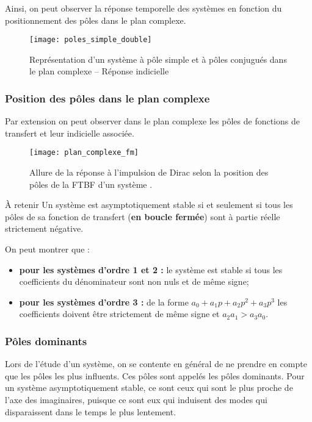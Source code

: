 Ainsi, on peut observer la réponse temporelle des systèmes en fonction du positionnement des pôles dans le plan complexe. 

\begin{figure}[H]
\centering
\texttt{[image: poles\_simple\_double]}

\caption{Représentation d'un système à pôle simple et à pôles conjugués dans le plan complexe -- Réponse indicielle}
\end{figure}

\subsubsection{Position des pôles dans le plan complexe}
Par extension on peut observer dans le plan complexe les pôles de fonctions de transfert et leur indicielle associée.

\begin{figure}[H]
\texttt{[image: plan\_complexe\_fm]}

\caption{Allure de la réponse à l’impulsion de Dirac selon la position des pôles de la FTBF d’un système \cite{F. Mathurin}.}
\end{figure}

\begin{defi}{À retenir}
Un système est asymptotiquement stable si et seulement si tous les pôles de sa fonction de transfert (\textbf{en boucle fermée}) sont à partie réelle strictement négative. 

\end{defi}

\begin{remarque}On peut montrer que :
\begin{itemize}
\item \textbf{pour les systèmes d'ordre 1 et 2 :} le système est stable si tous les coefficients du dénominateur sont non nuls et de même signe;
\item \textbf{pour les systèmes d'ordre 3 :} de la forme $a_0+a_1p+a_2p^2+a_3p^3$ les coefficients doivent être strictement de même signe et $a_2 a_1 > a_3 a_0$.
\end{itemize}
\end{remarque}

\subsubsection{Pôles dominants \cite{1}}
Lors de l’étude d’un système, on se contente en général de ne prendre en compte que les pôles les plus influents. Ces pôles sont appelés les pôles dominants. Pour un système asymptotiquement stable, ce sont ceux qui sont le plus proche de l’axe des imaginaires, puisque ce sont eux qui induisent des modes qui disparaissent dans le temps le plus lentement.

